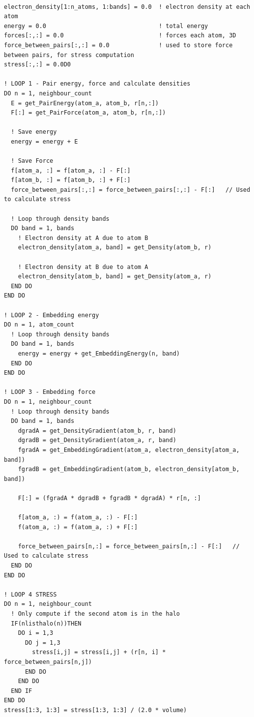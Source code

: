 \begin{lstlisting}[style=sFortran,caption={Pseudo Code for Energy and Stress Force Calculation}, label={listing:efscalc}]

electron_density[1:n_atoms, 1:bands] = 0.0  ! electron density at each atom
energy = 0.0                                ! total energy
forces[:,:] = 0.0                           ! forces each atom, 3D
force_between_pairs[:,:] = 0.0              ! used to store force between pairs, for stress computation
stress[:,:] = 0.0D0

! LOOP 1 - Pair energy, force and calculate densities
DO n = 1, neighbour_count
  E = get_PairEnergy(atom_a, atom_b, r[n,:])
  F[:] = get_PairForce(atom_a, atom_b, r[n,:])

  ! Save energy
  energy = energy + E

  ! Save Force
  f[atom_a, :] = f[atom_a, :] - F[:]
  f[atom_b, :] = f[atom_b, :] + F[:]
  force_between_pairs[:,:] = force_between_pairs[:,:] - F[:]   // Used to calculate stress
  
  ! Loop through density bands
  DO band = 1, bands
    ! Electron density at A due to atom B
    electron_density[atom_a, band] = get_Density(atom_b, r)
  
    ! Electron density at B due to atom A
    electron_density[atom_b, band] = get_Density(atom_a, r)
  END DO
END DO

! LOOP 2 - Embedding energy
DO n = 1, atom_count
  ! Loop through density bands
  DO band = 1, bands
    energy = energy + get_EmbeddingEnergy(n, band)
  END DO
END DO

! LOOP 3 - Embedding force
DO n = 1, neighbour_count
  ! Loop through density bands
  DO band = 1, bands
    dgradA = get_DensityGradient(atom_b, r, band)
    dgradB = get_DensityGradient(atom_a, r, band)
    fgradA = get_EmbeddingGradient(atom_a, electron_density[atom_a, band])
    fgradB = get_EmbeddingGradient(atom_b, electron_density[atom_b, band])

    F[:] = (fgradA * dgradB + fgradB * dgradA) * r[n, :]

    f[atom_a, :) = f(atom_a, :) - F[:] 
    f(atom_a, :) = f(atom_a, :) + F[:] 
    
    force_between_pairs[n,:] = force_between_pairs[n,:] - F[:]   // Used to calculate stress
  END DO
END DO

! LOOP 4 STRESS
DO n = 1, neighbour_count
  ! Only compute if the second atom is in the halo 
  IF(nlisthalo(n))THEN  
    DO i = 1,3
      DO j = 1,3
        stress[i,j] = stress[i,j] + (r[n, i] * force_between_pairs[n,j])
      END DO
    END DO
  END IF
END DO
stress[1:3, 1:3] = stress[1:3, 1:3] / (2.0 * volume)

\end{lstlisting}